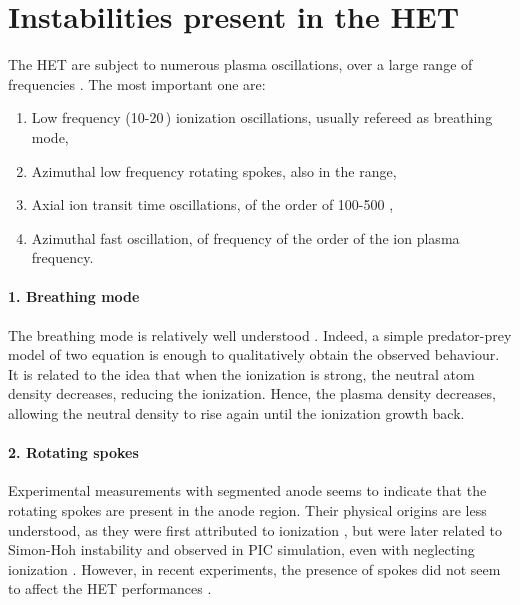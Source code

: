 

\section*{Instabilities present in the \ac{HET} }
\label{sec-physics}

The \ac{HET} are subject to numerous plasma oscillations, over a large range of frequencies \citep{boeuf2017,choueiri2001}.
The most important one are\string:
\begin{enumerate}
  \item Low frequency (10-20\,\kilo\hertz) ionization oscillations, usually refereed as breathing mode,
  \item Azimuthal low frequency rotating spokes, also in the \kilo\hertz range,
  \item Axial ion transit time oscillations, of the order of 100-500 \kilo\hertz,
  \item Azimuthal fast oscillation, of frequency of the order of the ion plasma frequency.
\end{enumerate} 

\paragraph{1. Breathing mode\\}
The breathing mode is relatively well understood \citep{boeuf1998,barral2009,hara2014}.
Indeed, a simple predator-prey model of two equation is enough to qualitatively obtain the observed behaviour.
It is related to the idea that when the ionization is strong, the neutral atom density decreases, reducing the ionization.
Hence, the plasma density decreases, allowing the neutral density to rise again until the ionization growth back.

\paragraph{2. Rotating spokes\\}
Experimental measurements with segmented anode \citep{ellison2012,mcdonald2011} seems to indicate that the rotating spokes are present in the anode region.
Their physical origins are less understood, as they were first attributed to ionization \citep{janes1966}, but were later related to Simon-Hoh instability and observed in \ac{PIC} simulation, even with neglecting ionization \citep{carlsson2018}.
However, in recent experiments, the presence of spokes did not seem to affect the \ac{HET} performances \citep{boeuf2018}.

